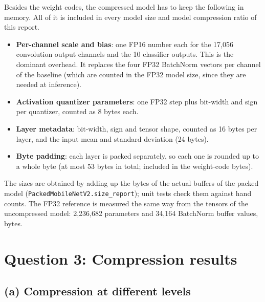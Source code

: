 \documentclass[11pt,a4paper]{article}
\begin{document}
Besides the weight codes, the compressed model has to keep the following in memory. All of it is included in every model size and model compression ratio of this report.

\begin{table}[H]
\centering
\small
\resizebox{\linewidth}{!}{}
\caption{In-memory size of the final model \texttt{\BestName}, split into weight codes and overheads.}
\label{tab:overheads}
\end{table}

\begin{itemize}
\item \textbf{Per-channel scale and bias}: one FP16 number each for the 17{,}056 convolution output channels and the 10 classifier outputs. This is the dominant overhead. It replaces the four FP32 BatchNorm vectors per channel of the baseline (which are counted in the FP32 model size, since they are needed at inference).
\item \textbf{Activation quantizer parameters}: one FP32 step plus bit-width and sign per quantizer, counted as 8 bytes each.
\item \textbf{Layer metadata}: bit-width, sign and tensor shape, counted as 16 bytes per layer, and the input mean and standard deviation (24 bytes).
\item \textbf{Byte padding}: each layer is packed separately, so each one is rounded up to a whole byte (at most 53 bytes in total; included in the weight-code bytes).
\end{itemize}
The sizes are obtained by adding up the bytes of the actual buffers of the packed model (\texttt{PackedMobileNetV2.size\_report}); unit tests check them against hand counts. The FP32 reference is measured the same way from the tensors of the uncompressed model: 2{,}236{,}682 parameters and 34{,}164 BatchNorm buffer values, \FPModelBytes{} bytes.

\section*{Question 3: Compression results}

\subsection*{(a) Compression at different levels}
\end{document}
